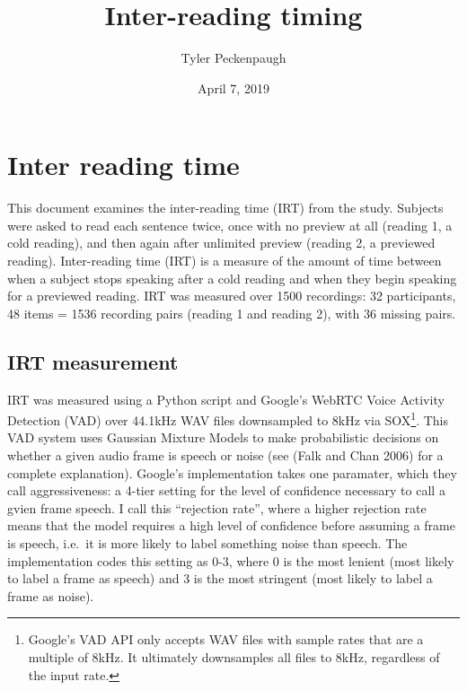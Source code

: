\documentclass[]{tufte-handout}
\title{Inter-reading timing}
\author{Tyler Peckenpaugh}
\date{April 7, 2019}
\begin{document}
\maketitle



{
\setcounter{tocdepth}{2}
\tableofcontents
}

\section{Inter reading time}\label{inter-reading-time}

This document examines the inter-reading time (IRT) from the study.
Subjects were asked to read each sentence twice, once with no preview at
all (reading 1, a cold reading), and then again after unlimited preview
(reading 2, a previewed reading). Inter-reading time (IRT) is a measure
of the amount of time between when a subject stops speaking after a cold
reading and when they begin speaking for a previewed reading. IRT was
measured over 1500 recordings: 32 participants, 48 items = 1536
recording pairs (reading 1 and reading 2), with 36 missing pairs.

\subsection{IRT measurement}\label{irt-measurement}

IRT was measured using a Python script and Google's WebRTC Voice
Activity Detection (VAD) over 44.1kHz WAV files downsampled to 8kHz via
SOX\footnote{Google's VAD API only accepts WAV files with sample rates
  that are a multiple of 8kHz. It ultimately downsamples all files to
  8kHz, regardless of the input rate.}. This VAD system uses Gaussian
Mixture Models to make probabilistic decisions on whether a given audio
frame is speech or noise (see (Falk and Chan 2006) for a complete
explanation). Google's implementation takes one paramater, which they
call aggressiveness: a 4-tier setting for the level of confidence
necessary to call a gvien frame speech. I call this ``rejection rate'',
where a higher rejection rate means that the model requires a high level
of confidence before assuming a frame is speech, i.e.~it is more likely
to label something noise than speech. The implementation codes this
setting as 0-3, where 0 is the most lenient (most likely to label a
frame as speech) and 3 is the most stringent (most likely to label a
frame as noise).
\end{document}
